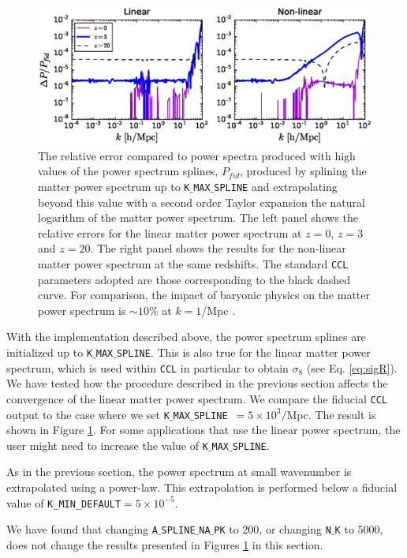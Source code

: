 \documentclass[\docopts]{\docclass}
\newcommand{\ccl}{{\tt CCL}\xspace}
\begin{document}
\begin{figure}
\centering
\includegraphics[width=1.0\textwidth]{plot_power.eps}
\caption{The relative error compared to power spectra produced with high values of the power spectrum splines, $P_{fid}$, produced by splining the matter power spectrum up to {\tt K$\_$MAX$\_$SPLINE} and extrapolating beyond this value with a second order Taylor expansion the natural logarithm of the matter power spectrum. The left panel shows the relative errors for the linear matter power spectrum at $z=0$, $z=3$ and $z=20$. The right panel shows the results for the non-linear matter power spectrum at the same redshifts. The standard \ccl parameters adopted are those corresponding to the black dashed curve. For comparison, the impact of baryonic physics on the matter power spectrum is $\sim 10\%$ at $k=1$/Mpc \citep{Schneider15}.}
\label{fig:NLextrapol}
\end{figure}

With the implementation described above, the power spectrum splines are initialized up to {\tt K$\_$MAX$\_$SPLINE}. This is also true for the linear matter power spectrum, which is used within \ccl in particular to obtain $\sigma_8$ (see Eq. \ref{eq:sigR}). We have tested how the procedure described in the previous section affects the convergence of the linear matter power spectrum. We compare the fiducial \ccl output to the case where we set {\tt K$\_$MAX$\_$SPLINE}~$=5\times 10^3/$Mpc. The result is shown in Figure \ref{fig:NLextrapol}. For some applications that use the linear power spectrum, the user might need to increase the value of {\tt K$\_$MAX$\_$SPLINE}.

As in the previous section, the power spectrum at small wavenumber is extrapolated using a power-law. This extrapolation is performed below a fiducial value of {\tt K\_MIN\_DEFAULT}$=5\times 10^{-5}$.

We have found that changing {\tt A$\_$SPLINE$\_$NA$\_$PK} to $200$, or changing {\tt N$\_$K} to $5000$, does not change the results presented in Figures \ref{fig:NLextrapol} in this section.
\end{document}
